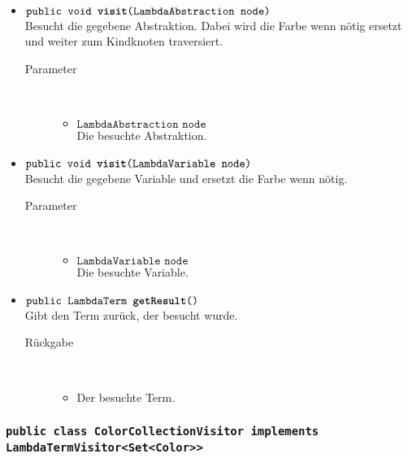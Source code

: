 \begin{description}
\begin{itemize}
		\item $\texttt{public void \textbf{visit}(LambdaAbstraction node)}$ \\ Besucht die gegebene Abstraktion. Dabei wird die Farbe wenn nötig ersetzt und weiter zum Kindknoten traversiert.
		\begin{description}
			\item[Parameter] \hfill \\
			\vspace{-.8cm}
			\begin{itemize}
				\item $\texttt{LambdaAbstraction node}$ \\ Die besuchte Abstraktion.
			\end{itemize}
		\end{description}
		
		\item $\texttt{public void \textbf{visit}(LambdaVariable node)}$ \\ Besucht die gegebene Variable und ersetzt die Farbe wenn nötig.
		\begin{description}
			\item[Parameter] \hfill \\
			\vspace{-.8cm}
			\begin{itemize}
				\item $\texttt{LambdaVariable node}$ \\ Die besuchte Variable.
			\end{itemize}
		\end{description}
		
		\item $\texttt{public LambdaTerm \textbf{getResult}()}$ \\ Gibt den Term zurück, der besucht wurde.
		\begin{description}
			\item[Rückgabe] \hfill \\
			\vspace{-.8cm}
			\begin{itemize}
				\item Der besuchte Term.
			\end{itemize}
		\end{description}
	\end{itemize}
\end{description}

\subsubsection{\normalfont \texttt{public class \textbf{ColorCollectionVisitor} implements LambdaTermVisitor<Set<Color>{}>}}

